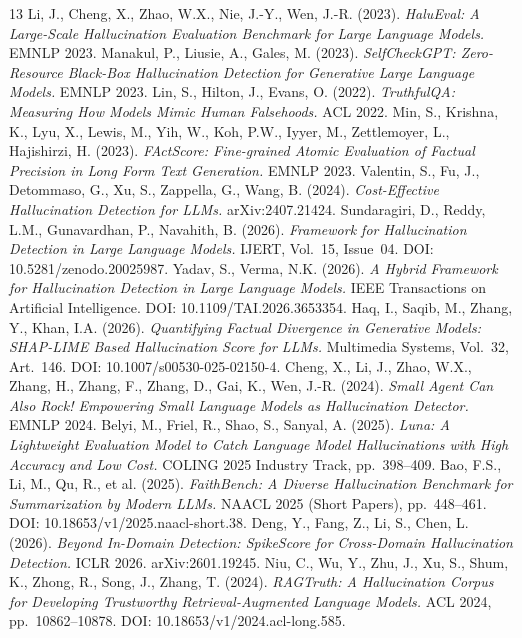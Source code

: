 \documentclass[12pt,a4paper]{article}
\begin{document}
\begin{thebibliography}{13}
     Li, J., Cheng, X., Zhao, W.X., Nie, J.-Y., Wen, J.-R. (2023). \emph{HaluEval: A Large-Scale Hallucination Evaluation Benchmark for Large Language Models.} EMNLP 2023.
     Manakul, P., Liusie, A., Gales, M. (2023). \emph{SelfCheckGPT: Zero-Resource Black-Box Hallucination Detection for Generative Large Language Models.} EMNLP 2023.
     Lin, S., Hilton, J., Evans, O. (2022). \emph{TruthfulQA: Measuring How Models Mimic Human Falsehoods.} ACL 2022.
     Min, S., Krishna, K., Lyu, X., Lewis, M., Yih, W., Koh, P.W., Iyyer, M., Zettlemoyer, L., Hajishirzi, H. (2023). \emph{FActScore: Fine-grained Atomic Evaluation of Factual Precision in Long Form Text Generation.} EMNLP 2023.
     Valentin, S., Fu, J., Detommaso, G., Xu, S., Zappella, G., Wang, B. (2024). \emph{Cost-Effective Hallucination Detection for LLMs.} arXiv:2407.21424.
     Sundaragiri, D., Reddy, L.M., Gunavardhan, P., Navahith, B. (2026). \emph{Framework for Hallucination Detection in Large Language Models.} IJERT, Vol.~15, Issue~04. DOI: 10.5281/zenodo.20025987.
     Yadav, S., Verma, N.K. (2026). \emph{A Hybrid Framework for Hallucination Detection in Large Language Models.} IEEE Transactions on Artificial Intelligence. DOI: 10.1109/TAI.2026.3653354.
     Haq, I., Saqib, M., Zhang, Y., Khan, I.A. (2026). \emph{Quantifying Factual Divergence in Generative Models: SHAP-LIME Based Hallucination Score for LLMs.} Multimedia Systems, Vol.~32, Art.~146. DOI: 10.1007/s00530-025-02150-4.
     Cheng, X., Li, J., Zhao, W.X., Zhang, H., Zhang, F., Zhang, D., Gai, K., Wen, J.-R. (2024). \emph{Small Agent Can Also Rock! Empowering Small Language Models as Hallucination Detector.} EMNLP 2024.
     Belyi, M., Friel, R., Shao, S., Sanyal, A. (2025). \emph{Luna: A Lightweight Evaluation Model to Catch Language Model Hallucinations with High Accuracy and Low Cost.} COLING 2025 Industry Track, pp.~398--409.
     Bao, F.S., Li, M., Qu, R., et al. (2025). \emph{FaithBench: A Diverse Hallucination Benchmark for Summarization by Modern LLMs.} NAACL 2025 (Short Papers), pp.~448--461. DOI: 10.18653/v1/2025.naacl-short.38.
     Deng, Y., Fang, Z., Li, S., Chen, L. (2026). \emph{Beyond In-Domain Detection: SpikeScore for Cross-Domain Hallucination Detection.} ICLR 2026. arXiv:2601.19245.
     Niu, C., Wu, Y., Zhu, J., Xu, S., Shum, K., Zhong, R., Song, J., Zhang, T. (2024). \emph{RAGTruth: A Hallucination Corpus for Developing Trustworthy Retrieval-Augmented Language Models.} ACL 2024, pp.~10862--10878. DOI: 10.18653/v1/2024.acl-long.585.
\end{thebibliography}
\end{document}
